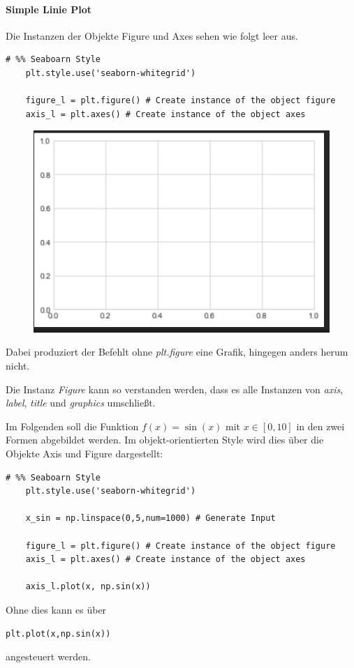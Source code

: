 \paragraph{Simple Linie Plot}
Die Instanzen der Objekte Figure und Axes sehen wie folgt leer aus.
\begin{lstlisting}[style=Python]
	# %% Seaboarn Style
	plt.style.use('seaborn-whitegrid')
	
	figure_l = plt.figure() # Create instance of the object figure
	axis_l = plt.axes() # Create instance of the object axes
\end{lstlisting}
\begin{figure}[H]
	\centering
	\includegraphics[scale = 0.8]{attachment/chapter_4/Scc021}
\end{figure}
Dabei produziert der Befehlt ohne \textit{plt.figure} eine Grafik, hingegen anders herum nicht.

Die Instanz \textit{Figure} kann so verstanden werden, dass es alle Instanzen von \textit{axis}, \textit{label}, \textit{title} und \textit{graphics} umschließt.

Im Folgenden soll die Funktion $f(x)=\sin(x)$ mit $x\in [0,10]$ in den zwei Formen abgebildet werden. Im objekt-orientierten Style wird dies über die Objekte Axis und Figure dargestellt:
\begin{lstlisting}[style=python]
	# %% Seaboarn Style
	plt.style.use('seaborn-whitegrid')
	
	x_sin = np.linspace(0,5,num=1000) # Generate Input
	
	figure_l = plt.figure() # Create instance of the object figure
	axis_l = plt.axes() # Create instance of the object axes
	
	axis_l.plot(x, np.sin(x))
\end{lstlisting}
Ohne dies kann es über 
\begin{lstlisting}[style=python]
	plt.plot(x,np.sin(x))
\end{lstlisting}
angesteuert werden.

